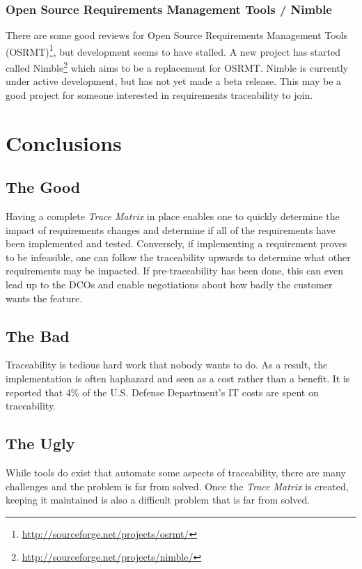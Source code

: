 \documentclass[10pt, openany]{report}
\newcommand{\trace}{\emph{Trace Matrix}}
\begin{document}
\subsection{Open Source Requirements Management Tools / Nimble}
There are some good reviews for Open Source Requirements Management Tools (OSRMT)\footnote{\url{http://sourceforge.net/projects/osrmt/}}, but development seems to have stalled.  A new project has started called Nimble\footnote{\url{http://sourceforge.net/projects/nimble/}} which aims to be a replacement for OSRMT.  Nimble is currently under active development, but has not yet made a beta release.  This may be a good project for someone interested in requirements traceability to join.


\chapter{Conclusions}
\section{The Good}
Having a complete \trace{} in place enables one to quickly determine the impact of requirements changes and determine if all of the requirements have been implemented and tested.  Conversely, if implementing a requirement proves to be infeasible, one can follow the traceability upwards to determine what other requirements may be impacted.  If pre-traceability has been done, this can even lead up to the DCOs and enable negotiations about how badly the customer wants the feature.

\section{The Bad}
Traceability is tedious hard work that nobody wants to do. As a result, the implementation is often haphazard\cite{req9} and seen as a cost rather than a benefit.  It is reported\cite{req2} that 4\% of the U.S. Defense Department's IT costs are spent on traceability.

\section{The Ugly}
While tools do exist that automate some aspects of traceability, there are many challenges and the problem is far from solved\cite{req10}.  Once the \trace{} is created, keeping it maintained is also a difficult problem that is far from solved\cite{req11}.
\end{document}
